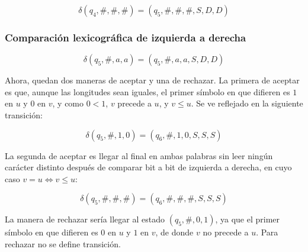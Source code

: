\documentclass[12pt]{article}
\begin{document}
\begin{ejercicio}
        $$\delta(q_4, \#, \#, \#) = (q_5, \#, \#, \#, S, D, D)$$

        \subsubsection*{Comparación lexicográfica de izquierda a derecha}

        $$\delta(q_5, \#, a, a) = (q_5, \#, a, a, S, D, D)$$

        Ahora, quedan dos maneras de aceptar y una de rechazar. La primera
        de aceptar es que, aunque las longitudes sean iguales, el primer símbolo en que 
        difieren es $1$ en $u$ y $0$ en $v$, y como $0 < 1$, $v$ precede a $u$, y 
        $v \leq u$. Se ve reflejado en la siguiente transición:

        $$\delta(q_5, \#, 1, 0) = (q_6, \#, 1, 0, S, S, S)$$

        La segunda de aceptar es llegar al final en ambas palabras sin leer
        ningún carácter distinto después de comparar bit a bit de izquierda a derecha, 
        en cuyo caso $v = u \iff v \leq u$:

        $$\delta(q_5, \#, \#, \#) = (q_6, \#, \#, \#, S, S, S)$$

        La manera de rechazar sería llegar al estado $(q_5, \#, 0, 1)$,
        ya que el primer símbolo en que difieren es $0$ en $u$ y $1$ en $v$, 
        de donde $v$ no precede a $u$. Para rechazar no se define transición.

    \end{ejercicio}
\end{document}
